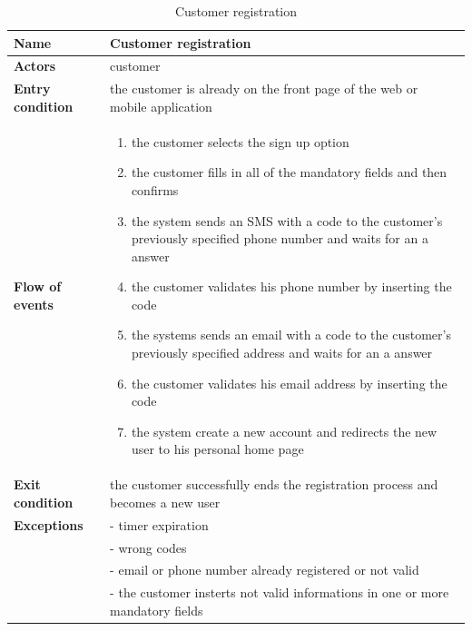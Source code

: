 \begin{table}[h!]
    \centering
    \begin{tabular}{@{}P{0.2\textwidth}P{0.70\textwidth}@{}}
        \toprule
        \textbf{Name}                 & Customer registration\\
        \midrule
        \textbf{Actors}               & customer\\
        \textbf{Entry condition}      & the customer is already on the front page of the web or mobile application\\
        \textbf{Flow of events}       & 
        \begin{enumerate}[nolistsep, leftmargin=*]
            \item the customer selects the sign up option
            \item the customer fills in all of the mandatory fields and then confirms
            \item the system sends an SMS with a code to the customer's previously specified phone number and waits for an a answer
            \item the customer validates his phone number by inserting the code
            \item the systems sends an email with a code to the customer's previously specified address and waits for an a answer
            \item the customer validates his email address by inserting the code
            \item the system create a new account and redirects the new user to his personal home page
        \end{enumerate} \\
        \textbf{Exit condition}       & the customer successfully ends the registration process and becomes a new user\\
        \textbf{Exceptions}           
        & - timer expiration\\
        & - wrong codes\\
        & - email or phone number already registered or not valid\\
        & - the customer insterts not valid informations in one or more mandatory fields\\
        \bottomrule
    \end{tabular}
\caption{Customer registration}
\label{table:customerregitration}
\end{table}

